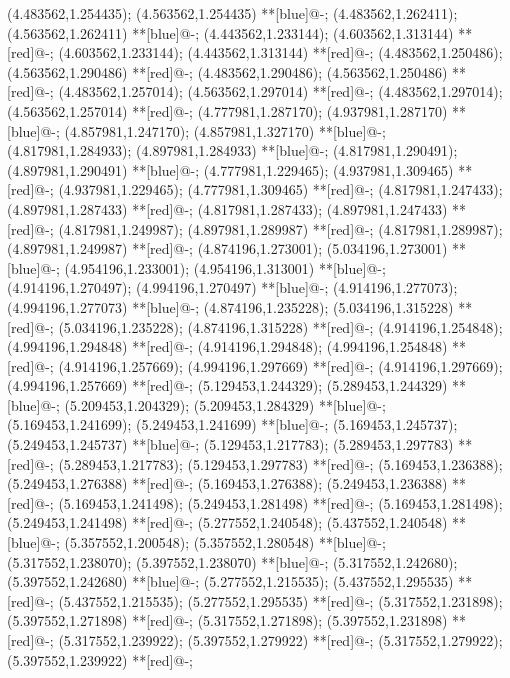 (4.483562,1.254435); (4.563562,1.254435) **[blue]@{-};
(4.483562,1.262411); (4.563562,1.262411) **[blue]@{-};
(4.443562,1.233144); (4.603562,1.313144) **[red]@{-};
(4.603562,1.233144); (4.443562,1.313144) **[red]@{-};
(4.483562,1.250486); (4.563562,1.290486) **[red]@{-};
(4.483562,1.290486); (4.563562,1.250486) **[red]@{-};
(4.483562,1.257014); (4.563562,1.297014) **[red]@{-};
(4.483562,1.297014); (4.563562,1.257014) **[red]@{-};
(4.777981,1.287170); (4.937981,1.287170) **[blue]@{-};
(4.857981,1.247170); (4.857981,1.327170) **[blue]@{-};
(4.817981,1.284933); (4.897981,1.284933) **[blue]@{-};
(4.817981,1.290491); (4.897981,1.290491) **[blue]@{-};
(4.777981,1.229465); (4.937981,1.309465) **[red]@{-};
(4.937981,1.229465); (4.777981,1.309465) **[red]@{-};
(4.817981,1.247433); (4.897981,1.287433) **[red]@{-};
(4.817981,1.287433); (4.897981,1.247433) **[red]@{-};
(4.817981,1.249987); (4.897981,1.289987) **[red]@{-};
(4.817981,1.289987); (4.897981,1.249987) **[red]@{-};
(4.874196,1.273001); (5.034196,1.273001) **[blue]@{-};
(4.954196,1.233001); (4.954196,1.313001) **[blue]@{-};
(4.914196,1.270497); (4.994196,1.270497) **[blue]@{-};
(4.914196,1.277073); (4.994196,1.277073) **[blue]@{-};
(4.874196,1.235228); (5.034196,1.315228) **[red]@{-};
(5.034196,1.235228); (4.874196,1.315228) **[red]@{-};
(4.914196,1.254848); (4.994196,1.294848) **[red]@{-};
(4.914196,1.294848); (4.994196,1.254848) **[red]@{-};
(4.914196,1.257669); (4.994196,1.297669) **[red]@{-};
(4.914196,1.297669); (4.994196,1.257669) **[red]@{-};
(5.129453,1.244329); (5.289453,1.244329) **[blue]@{-};
(5.209453,1.204329); (5.209453,1.284329) **[blue]@{-};
(5.169453,1.241699); (5.249453,1.241699) **[blue]@{-};
(5.169453,1.245737); (5.249453,1.245737) **[blue]@{-};
(5.129453,1.217783); (5.289453,1.297783) **[red]@{-};
(5.289453,1.217783); (5.129453,1.297783) **[red]@{-};
(5.169453,1.236388); (5.249453,1.276388) **[red]@{-};
(5.169453,1.276388); (5.249453,1.236388) **[red]@{-};
(5.169453,1.241498); (5.249453,1.281498) **[red]@{-};
(5.169453,1.281498); (5.249453,1.241498) **[red]@{-};
(5.277552,1.240548); (5.437552,1.240548) **[blue]@{-};
(5.357552,1.200548); (5.357552,1.280548) **[blue]@{-};
(5.317552,1.238070); (5.397552,1.238070) **[blue]@{-};
(5.317552,1.242680); (5.397552,1.242680) **[blue]@{-};
(5.277552,1.215535); (5.437552,1.295535) **[red]@{-};
(5.437552,1.215535); (5.277552,1.295535) **[red]@{-};
(5.317552,1.231898); (5.397552,1.271898) **[red]@{-};
(5.317552,1.271898); (5.397552,1.231898) **[red]@{-};
(5.317552,1.239922); (5.397552,1.279922) **[red]@{-};
(5.317552,1.279922); (5.397552,1.239922) **[red]@{-};

